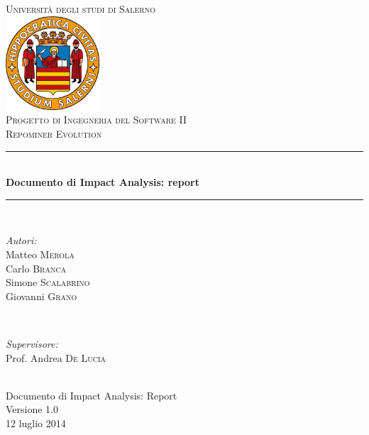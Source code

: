 \documentclass[a4paper, 12pt, italian]{report}
\begin{document}
\begin{titlepage}
\newcommand{\HRule}{\rule{\linewidth}{0.5mm}} 
\center 
\textsc{\LARGE Università degli studi di Salerno}\\[1cm] 
\includegraphics[width=3.5cm]{img/logo.jpg} \\[1cm]
\textsc{\large Progetto di Ingegneria del Software II}\\[0.5cm]
\textsc{\Large Repominer Evolution}\\[0.5cm] 
 \HRule \\[0.4cm]
{ \large \bfseries Documento di Impact Analysis: report}\\[0.4cm] 
\HRule \\[1.5cm]

\begin{minipage}{0.4\textwidth}
\begin{flushleft} \large
\emph{Autori:}\\
Matteo \textsc{Merola}\\
Carlo \textsc{Branca}\\
Simone \textsc{Scalabrino}\\
Giovanni \textsc{Grano}\\
\end{flushleft}
\end{minipage}
~
\begin{minipage}{0.4\textwidth}
\begin{flushright} \large
\emph{Supervisore:} \\
Prof. Andrea \textsc{De Lucia}
\end{flushright}
\end{minipage}\\[2.5cm]

{\Large Documento di Impact Analysis: Report}\\
Versione 1.0\\[1cm]

{\large 12 luglio 2014} %

\vfill

\end{titlepage}	
    
	\setcounter{tocdepth}{1}	
	\tableofcontents
	\listoffigures
	
	
	
	
	
	
	
%
\end{document}
